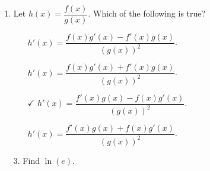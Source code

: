 \documentclass[11pt]{article}
\begin{document}
\pagestyle{empty}
\newsavebox{\quizfront}
\begin{lrbox}{\quizfront}
\begin{minipage}[top][4.5in][t]{\textwidth} \setlength{\parindent}{1.5em}
\drawtitle
\vspace{-0.5in}
\begin{enumerate}

\item Let $h(x) = \dfrac{f(x)}{g(x)}$.  Which of the following is true?
  \vfill
  \begin{itemize}
  \item[\textbigcircle] $h'(x) = \dfrac{f(x)g'(x)-f'(x)g(x)}{(g(x))^2}$.
    \vfill
  \item[\textbigcircle] $h'(x) = \dfrac{f(x)g'(x)+f'(x)g(x)}{(g(x))^2}$.
    \vfill
  \item[\textcircled{{\color{blue}$\checkmark$}}] $h'(x) =
    \dfrac{f'(x)g(x)-f(x)g'(x)}{(g(x))^2}$.  \vfill
  \item[\textbigcircle] $h'(x) = \dfrac{f'(x)g(x)+f(x)g'(x)}{(g(x))^2}$.
    \vfill
  \end{itemize}
\end{enumerate}



\end{minipage}
\end{lrbox}

\newsavebox{\quizback}
\begin{lrbox}{\quizback}
\begin{minipage}[top][4.5in][t]{\textwidth} \setlength{\parindent}{1.5em}
\begin{itemize}
 \item[3.] Find $\ln(e)$. 


\end{itemize}
\end{minipage}
\end{lrbox}

\noindent \usebox{\quizfront}
\vfill

\end{document}
